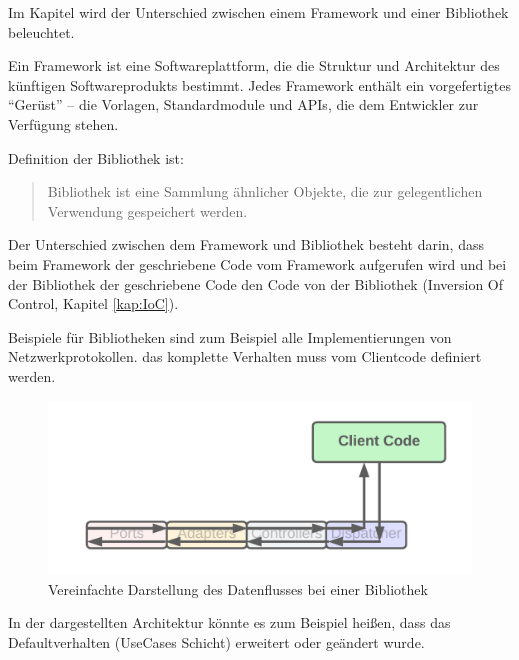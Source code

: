Im Kapitel wird der Unterschied zwischen einem Framework und einer Bibliothek beleuchtet.

Ein Framework ist eine Softwareplattform, die die Struktur und Architektur des künftigen Softwareprodukts bestimmt.
Jedes Framework enthält ein vorgefertigtes “Gerüst” – die Vorlagen, Standardmodule und APIs, 
die dem Entwickler zur Verfügung stehen.
\footnotemark
{}

Definition der Bibliothek ist:
\begin{quote}
    Bibliothek ist eine Sammlung ähnlicher Objekte, die zur gelegentlichen Verwendung gespeichert werden.\footnotemark
\end{quote}

Der Unterschied zwischen dem Framework und Bibliothek besteht darin, 
dass beim Framework der geschriebene Code vom Framework aufgerufen wird 
und bei der Bibliothek der geschriebene Code den Code von der Bibliothek  (Inversion Of Control, Kapitel \ref{kap:IoC}).
\footnotemark
{}

Beispiele für Bibliotheken sind zum Beispiel alle Implementierungen von Netzwerkprotokollen.
das komplette Verhalten muss vom Clientcode definiert werden.

\begin{figure}[H]
    \centering
    \includegraphics[width=1\textwidth]{./images/Dataflow Library.png}
    \caption{Vereinfachte Darstellung des Datenflusses bei einer Bibliothek}
    \label{fig:SimpliedDataflowLibrary}
\end{figure}

In der dargestellten Architektur könnte es zum Beispiel heißen, 
dass das Defaultverhalten (UseCases Schicht) erweitert oder geändert wurde.


